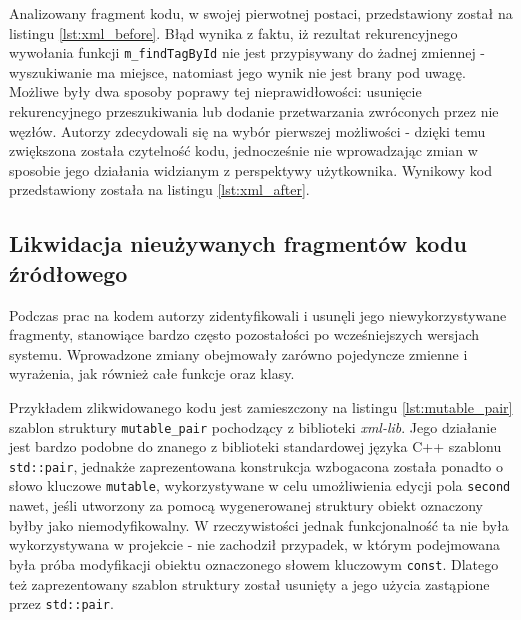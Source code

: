 Analizowany fragment kodu, w swojej pierwotnej postaci, przedstawiony został na listingu \ref{lst:xml_before}. Błąd wynika z faktu, iż rezultat rekurencyjnego wywołania funkcji \lstinline{m_findTagById} nie jest przypisywany do żadnej zmiennej - wyszukiwanie ma miejsce, natomiast jego wynik nie jest brany pod uwagę. Możliwe były dwa sposoby poprawy tej nieprawidłowości: usunięcie rekurencyjnego przeszukiwania lub dodanie przetwarzania zwróconych przez nie węzłów. Autorzy zdecydowali się na wybór pierwszej możliwości - dzięki temu zwiększona została czytelność kodu, jednocześnie nie wprowadzając zmian w sposobie jego działania widzianym z perspektywy użytkownika. Wynikowy kod przedstawiony została na listingu \ref{lst:xml_after}.






\subsection{Likwidacja nieużywanych fragmentów kodu źródłowego}
Podczas prac na kodem autorzy zidentyfikowali i usunęli jego niewykorzystywane fragmenty, stanowiące bardzo często pozostałości po wcześniejszych wersjach systemu. Wprowadzone zmiany obejmowały zarówno pojedyncze zmienne i wyrażenia, jak również całe funkcje oraz klasy. 

Przykładem zlikwidowanego kodu jest zamieszczony na listingu \ref{lst:mutable_pair} szablon struktury \lstinline{mutable_pair} pochodzący z biblioteki \emph{xml-lib}. Jego działanie jest bardzo podobne do znanego z biblioteki standardowej języka C++ szablonu \lstinline{std::pair}, jednakże zaprezentowana konstrukcja wzbogacona została ponadto o słowo kluczowe \lstinline{mutable}, wykorzystywane w celu umożliwienia edycji pola \lstinline{second} nawet, jeśli utworzony za pomocą wygenerowanej struktury obiekt oznaczony byłby jako niemodyfikowalny. W rzeczywistości jednak funkcjonalność ta nie była wykorzystywana w projekcie - nie zachodził przypadek, w którym podejmowana była próba modyfikacji obiektu oznaczonego słowem kluczowym \lstinline{const}. Dlatego też zaprezentowany szablon struktury został usunięty a jego użycia zastąpione przez \lstinline{std::pair}.

